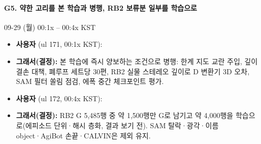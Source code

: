 \paragraph{G5. 약한 고리를 본 학습과 병행, RB2 보류분 일부를 학습으로}
{\small 09-29 (월) 00:1x -- 00:4x KST}
\begin{itemize}
  \item \textbf{사용자} (ul 171, 00:1x KST): 
  \item \textbf{그래서(결정):} 본 학습에 즉시 양보하는 조건으로 병행: 한계 지도 교란 주입, 깊이 결손 대책, 폐루프 세트당 30편, RB2 실물 스테레오 깊이로 D 변환기 3D 오차, SAM 필터 쏠림 점검, 에폭 중간 체크포인트 평가.
  \item \textbf{사용자} (ul 172, 00:4x KST): 
  \item \textbf{그래서(결정):} RB2 G 5,485행 중 약 1,500행만 G로 남기고 약 4,000행을 학습으로(에피소드 단위·해시 층화, 결과 보기 전). SAM 탈락·광각·이름 object·AgiBot 손끝·CALVIN은 제외 유지.
\end{itemize}

